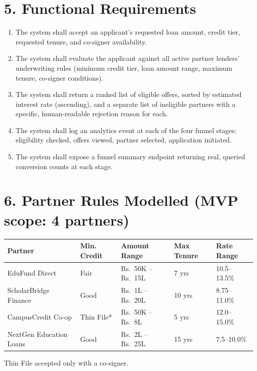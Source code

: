 \documentclass[10pt]{article}
\begin{document}
\section*{5. Functional Requirements}
\begin{enumerate}[leftmargin=18pt, itemsep=3pt]
\item The system shall accept an applicant's requested loan amount, credit tier, requested tenure, and co-signer availability.
\item The system shall evaluate the applicant against all active partner lenders' underwriting rules (minimum credit tier, loan amount range, maximum tenure, co-signer conditions).
\item The system shall return a ranked list of eligible offers, sorted by estimated interest rate (ascending), and a separate list of ineligible partners with a specific, human-readable rejection reason for each.
\item The system shall log an analytics event at each of the four funnel stages: eligibility checked, offers viewed, partner selected, application initiated.
\item The system shall expose a funnel summary endpoint returning real, queried conversion counts at each stage.
\end{enumerate}

\section*{6. Partner Rules Modelled (MVP scope: 4 partners)}
\begin{center}
\small
\begin{tabular}{lllll}
\toprule
\textbf{Partner} & \textbf{Min. Credit} & \textbf{Amount Range} & \textbf{Max Tenure} & \textbf{Rate Range} \\
\midrule
EduFund Direct & Fair & Rs.~50K -- Rs.~15L & 7 yrs & 10.5--13.5\% \\
ScholarBridge Finance & Good & Rs.~1L -- Rs.~20L & 10 yrs & 8.75--11.0\% \\
CampusCredit Co-op & Thin File* & Rs.~50K -- Rs.~8L & 5 yrs & 12.0--15.0\% \\
NextGen Education Loans & Good & Rs.~2L -- Rs.~25L & 15 yrs & 7.5--10.0\% \\
\bottomrule
\end{tabular}

\vspace{4pt}
\footnotesize *Thin File accepted only with a co-signer.
\end{center}
\end{document}
